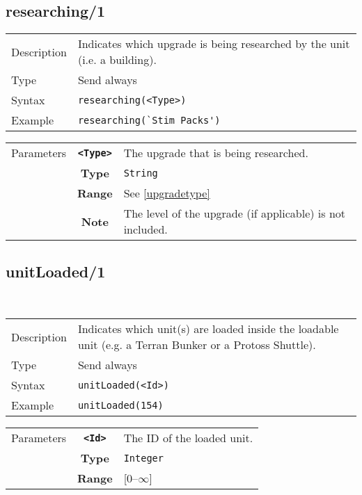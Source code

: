 \subsection{researching/1}
\begin{tabularx}{\textwidth}{lX}
 Description & Indicates which upgrade is being researched by the unit (i.e. a building). \\
 Type & Send always \\
 Syntax & \verb|researching(<Type>)| \\
 Example & \verb|researching(`Stim Packs')| \\
 \end{tabularx}
 \begin{tabularx}{\textwidth}{l | c | p{8cm}|}
 \cline{2-3}
 Parameters & \textbf{\verb|<Type>|} & The upgrade that is being researched. \\
            & \textbf{Type} & \verb|String| \\
            & \textbf{Range} & See \ref{upgradetype} \\
 			& \textbf{Note} & The level of the upgrade (if applicable) is not included. \\
            \cline{2-3}
\end{tabularx}

\subsection{unitLoaded/1}\
\begin{tabularx}{\textwidth}{lX}
 Description & Indicates which unit(s) are loaded inside the loadable unit (e.g. a Terran Bunker or a Protoss Shuttle).\\
 Type & Send always \\
 Syntax & \verb|unitLoaded(<Id>)| \\
 Example & \verb|unitLoaded(154)| \\
 \end{tabularx}
 \begin{tabularx}{\textwidth}{l | c | p{8cm}|}
 \cline{2-3}
 Parameters & \textbf{\verb|<Id>|} & The ID of the loaded unit. \\
            & \textbf{Type} & \verb|Integer| \\
            & \textbf{Range} & [0--$\infty$] \\
            \cline{2-3}
\end{tabularx}